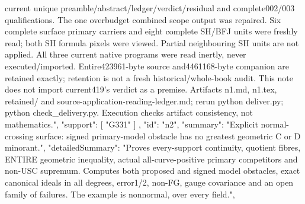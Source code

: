\documentclass[11pt]{article}
\begin{document}
\begin{Full422Data}
{{current unique preamble/abstract/ledger/verdict/residual and complete002/003 qualifications. The one overbudget combined scope output was repaired. Six complete surface primary carriers and eight complete SH/BFJ units were freshly read; both SH formula pixels were viewed. Partial neighbouring SH units are not applied. All three current native programs were read inertly, never executed/imported. Entire423961-byte source and4461168-byte companion are retained exactly; retention is not a fresh historical/whole-book audit. This note does not import current419's verdict as a premise. Artifacts n1.md, n1.tex, retained/ and source-application-reading-ledger.md; rerun python deliver.py; python check_delivery.py. Execution checks artifact consistency, not mathematics.",
      "support": [
        "G331"
      ]
    },
    {
      "id": "n2",
      "summary": "Explicit normal-crossing surface: signed primary-model obstacle has no greatest geometric C or D minorant.",
      "detailedSummary": "Proves every-support continuity, quotient fibres, ENTIRE geometric inequality, actual all-curve-positive primary competitors and non-USC supremum. Computes both proposed and signed model obstacles, exact canonical ideals in all degrees, error1/2, non-FG, gauge covariance and an open family of failures. The example is nonnormal, over every field.",
}}
\end{Full422Data}
\end{document}
